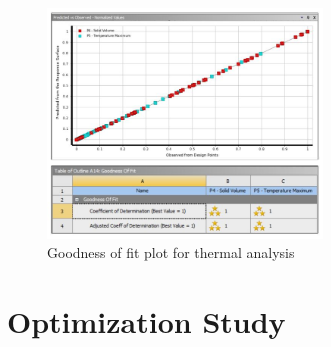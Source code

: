 \documentclass[12pt]{article}
\begin{document}
\begin{figure}[H]
\begin{center}
\includegraphics[width=0.65\textwidth]{reg3.jpg}
\caption{Goodness of fit plot for thermal analysis}
\end{center}
\end{figure}
\section{Optimization Study}
\end{document}
